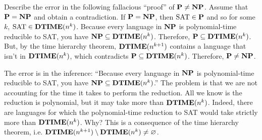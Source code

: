   \begin{problem}
    Describe the error in the following fallacious ``proof'' of $\textbf{P} \neq \textbf{NP}$. Assume that $\textbf{P} = \textbf{NP}$ and obtain a contradiction. If $\textbf{P} = \textbf{NP}$, then $\text{SAT} \in \textbf{P}$ and so for some $k$, $\text{SAT} \in \textbf{DTIME}(n^k)$. Because every language in $\textbf{NP}$ is polynomial-time reducible to SAT, you have $\textbf{NP} \subseteq \textbf{DTIME}(n^k)$. Therefore, $\textbf{P} \subseteq \textbf{DTIME}(n^k)$. But, by the time hierarchy theorem, $\textbf{DTIME}(n^{k + 1})$ contains a language that isn't in $\textbf{DTIME}(n^k)$, which contradicts $\textbf{P} \subseteq \textbf{DTIME}(n^k)$. Therefore, $\textbf{P} \neq \textbf{NP}$.

    \begin{sol}
      The error is in the inference: ``Because every language in $\textbf{NP}$ is polynomial-time reducible to SAT, you have $\textbf{NP} \subseteq \textbf{DTIME}(n^k)$.'' The problem is that we are not accounting for the time it takes to perform the reduction. All we know is the reduction is polynomial, but it may take more than $\textbf{DTIME}(n^k)$. Indeed, there are languages for which the polynomial-time reduction to SAT would take strictly more than $\textbf{DTIME}(n^k)$. Why? This is a consequence of the time hierarchy theorem, i.e. $\textbf{DTIME}(n^{k + 1}) \setminus \textbf{DTIME}(n^k) \neq \varnothing$.
    \end{sol}
  \end{problem}

